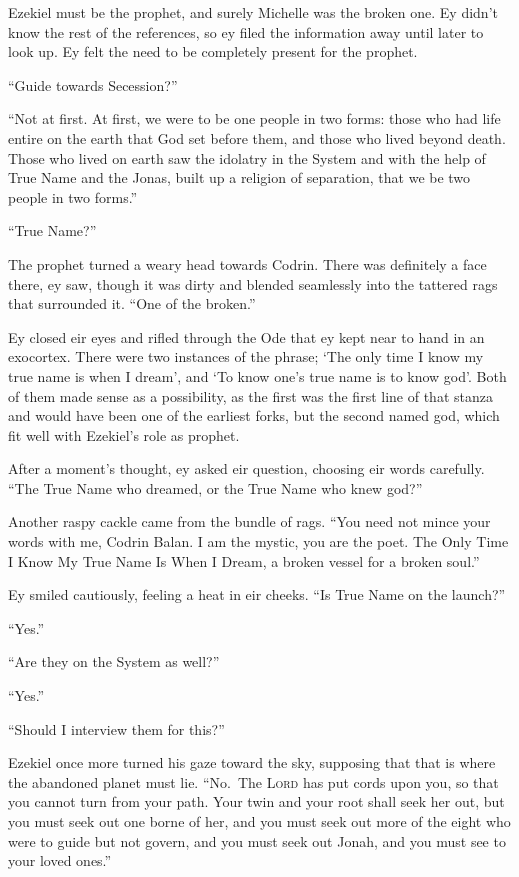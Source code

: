 Ezekiel must be the prophet, and surely Michelle was the broken one. Ey didn't know the rest of the references, so ey filed the information away until later to look up. Ey felt the need to be completely present for the prophet.

``Guide towards Secession?''

``Not at first. At first, we were to be one people in two forms: those who had life entire on the earth that God set before them, and those who lived beyond death. Those who lived on earth saw the idolatry in the System and with the help of True Name and the Jonas, built up a religion of separation, that we be two people in two forms.''

``True Name?''

The prophet turned a weary head towards Codrin. There was definitely a face there, ey saw, though it was dirty and blended seamlessly into the tattered rags that surrounded it. ``One of the broken.''

Ey closed eir eyes and rifled through the Ode that ey kept near to hand in an exocortex. There were two instances of the phrase; `The only time I know my true name is when I dream', and `To know one's true name is to know god'. Both of them made sense as a possibility, as the first was the first line of that stanza and would have been one of the earliest forks, but the second named god, which fit well with Ezekiel's role as prophet.

After a moment's thought, ey asked eir question, choosing eir words carefully. ``The True Name who dreamed, or the True Name who knew god?''

Another raspy cackle came from the bundle of rags. ``You need not mince your words with me, Codrin Balan. I am the mystic, you are the poet. The Only Time I Know My True Name Is When I Dream, a broken vessel for a broken soul.''

Ey smiled cautiously, feeling a heat in eir cheeks. ``Is True Name on the launch?''

``Yes.''

``Are they on the System as well?''

``Yes.''

``Should I interview them for this?''

Ezekiel once more turned his gaze toward the sky, supposing that that is where the abandoned planet must lie. ``No.~The \textsc{Lord} has put cords upon you, so that you cannot turn from your path. Your twin and your root shall seek her out, but you must seek out one borne of her, and you must seek out more of the eight who were to guide but not govern, and you must seek out Jonah, and you must see to your loved ones.''


